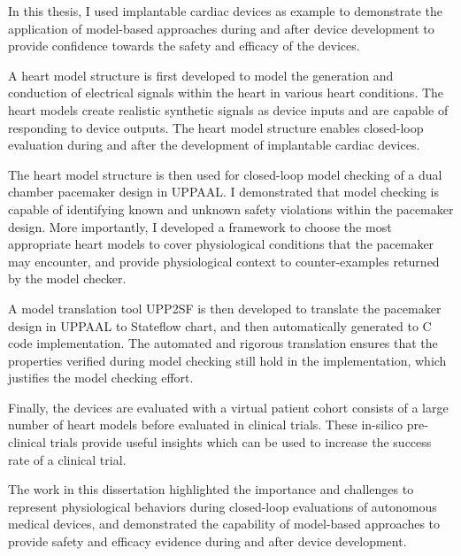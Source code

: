 \documentclass[12pt,letterpaper]{report}
\theoremstyle{definition}
\theoremstyle{remark}
\numberwithin{equation}{chapter}
\theoremstyle{plain} %
\begin{document}
In this thesis, I used implantable cardiac devices as example to demonstrate the application of model-based approaches during and after device development to provide confidence towards the safety and efficacy of the devices.

A heart model structure is first developed to model the generation and conduction of electrical signals within the heart in various heart conditions. 
The heart models create realistic synthetic signals as device inputs and are capable of responding to device outputs.
The heart model structure enables closed-loop evaluation during and after the development of implantable cardiac devices.

The heart model structure is then used for closed-loop model checking of a dual chamber pacemaker design in UPPAAL.
I demonstrated that model checking is capable of identifying known and unknown safety violations within the pacemaker design.
More importantly, I developed a framework to choose the most appropriate heart models to cover physiological conditions that the pacemaker may encounter, and provide physiological context to counter-examples returned by the model checker.

A model translation tool UPP2SF is then developed to translate the pacemaker design in UPPAAL to Stateflow chart, and then automatically generated to C code implementation.
The automated and rigorous translation ensures that the properties verified during model checking still hold in the implementation, which justifies the model checking effort.

Finally, the devices are evaluated with a virtual patient cohort consists of a large number of heart models before evaluated in clinical trials.
These in-silico pre-clinical trials provide useful insights which can be used to increase the success rate of a clinical trial.

The work in this dissertation highlighted the importance and challenges to represent physiological behaviors during closed-loop evaluations of autonomous medical devices, and demonstrated the capability of model-based approaches to provide safety and efficacy evidence during and after device development.





 



\newpage
{}
\tableofcontents
\clearpage
{}
{}
\listoftables
\clearpage
{}
{}
\listoffigures
\end{document}
